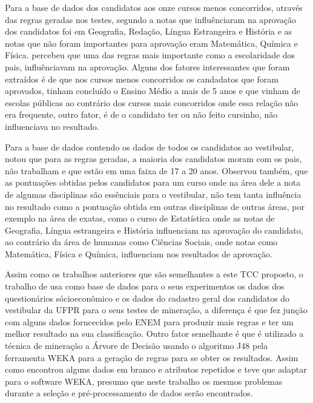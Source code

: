 \par
Para a base de dados dos candidatos aos onze cursos menos concorridos, através das regras geradas nos testes, segundo  a notas que influênciaram na aprovação dos candidatos foi em Geografia, Redação, Língua Estrangeira e História e as notas que não foram importantes para aprovação eram Matemática, Química e Física.  percebeu que uma das regras mais importante como a escolaridade dos pais, influênciavam na aprovação. Alguns dos fatores interessantes que foram extraídos é de que nos cursos menos concorridos os candadatos que foram aprovados, tinham concluído o Ensino Médio a mais de 5 anos e que vinham de escolas públicas ao contrário dos cursos mais concorridos onde essa relação não era frequente, outro fator, é de o candidato ter ou não feito cursinho, não influenciava no resultado.

\par
Para a base de dados contendo os dados de todos os candidatos ao vestibular,  notou que para as regras geradas, a maioria dos candidatos moram com os pais, não trabalham e que estão em uma faixa de 17 a 20 anos. Observou também, que as pontuações obtidas pelos candidatos para um curso onde na área dele a nota de algumas disciplinas são essênciais para o vestibular, não tem tanta influência no resultado como a pontuação obtida em outras disciplinas de outras áreas, por exemplo na área de exatas, como o curso de Estatística onde as notas de Geografia, Língua estrangeira e História influenciam na aprovação do candidato, ao contrário da área de humanas como Ciências Sociais, onde notas como Matemática, Física e Química, influenciam nos resultados de aprovação. 

\par
Assim como os trabalhos anteriores que são semelhantes a este TCC proposto, o trabalho de  usa como base de dados para o seus experimentos os dados dos questionários sócioeconômico e os dados do cadastro geral dos candidatos do vestibular da UFPR para o seus testes de mineração, a diferença é que  fez junção com alguns dados forncecidos pelo ENEM para produzir mais regras e ter um melhor resultado na sua classificação. Outro fator semelhante é que é utilizado a técnica de mineração a Árvore de Decisão usando o algoritmo J48 pela ferramenta WEKA para a geração de regras para se obter os resultados. Assim como  encontrou alguns dados em branco e atributos repetidos e teve que adaptar para o software WEKA, presumo que neste trabalho os mesmos problemas durante a seleção e pré-processamento de dados serão encontrados.

